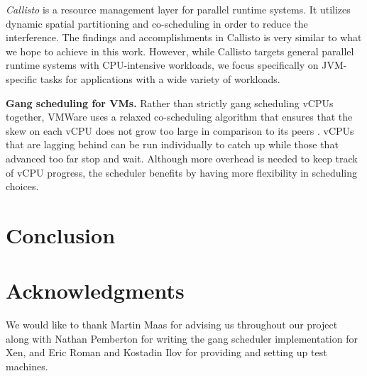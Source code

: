\documentclass{sig-alternate}
\begin{document}
\textit{Callisto} is a resource management layer for parallel runtime systems. It utilizes dynamic spatial partitioning and co-scheduling in order to reduce the interference. The findings and accomplishments in Callisto is very similar to what we hope to achieve in this work. However, while Callisto targets general parallel runtime systems with CPU-intensive workloads, we focus specifically on JVM-specific tasks for applications with a wide variety of workloads.

\textbf{Gang scheduling for VMs.} Rather than strictly gang scheduling vCPUs together, VMWare uses a relaxed co-scheduling algorithm that ensures that the skew on each vCPU does not grow too large in comparison to its peers \cite{vmware:whitepaper}. vCPUs that are lagging behind can be run individually to catch up while those that advanced too far stop and wait. Although more overhead is needed to keep track of vCPU progress, the scheduler benefits by having more flexibility in scheduling choices.

\section{Conclusion} \label{sec:conclusion}


\section{Acknowledgments}
We would like to thank Martin Maas for advising us throughout our project along with Nathan Pemberton for writing the gang scheduler implementation for Xen, and Eric Roman and Kostadin Ilov for providing and setting up test machines.


%
%

\balancecolumns
\end{document}
